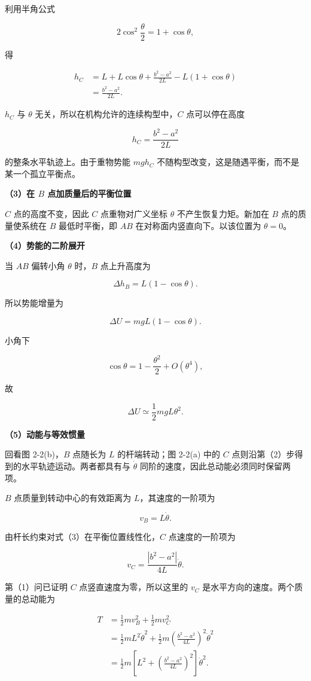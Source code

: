 \documentclass[12pt,a4paper,UTF8]{ctexart}
\begin{document}
利用半角公式

\[
2\cos^2\frac\theta2=1+\cos\theta,
\]

得

\[
\begin{aligned}
h_C
&=L+L\cos\theta
+\frac{b^2-a^2}{2L}
-L(1+\cos\theta)\\
&=\boxed{\frac{b^2-a^2}{2L}}.
\end{aligned}\tag{5}
\]

\(h_C\) 与 \(\theta\) 无关，所以在机构允许的连续构型中，\(C\)
点可以停在高度

\[
\boxed{h_C=\frac{b^2-a^2}{2L}}
\]

的整条水平轨迹上。由于重物势能 \(mgh_C\)
不随构型改变，这是随遇平衡，而不是某一个孤立平衡点。

\textbf{（3）在 \(B\) 点加质量后的平衡位置}

\(C\) 点的高度不变，因此 \(C\) 点重物对广义坐标 \(\theta\)
不产生恢复力矩。新加在 \(B\) 点的质量使系统在 \(B\) 最低时平衡，即
\(AB\) 在对称面内竖直向下。以该位置为 \(\theta=0\)。

\textbf{（4）势能的二阶展开}

当 \(AB\) 偏转小角 \(\theta\) 时，\(B\) 点上升高度为

\[
\Delta h_B=L(1-\cos\theta).
\]

所以势能增量为

\[
\Delta U=mgL(1-\cos\theta).
\]

小角下

\[
\cos\theta=1-\frac{\theta^2}{2}+O(\theta^4),
\]

故

\[
\boxed{
\Delta U\simeq\frac12mgL\theta^2
}.\tag{6}
\]

\textbf{（5）动能与等效惯量}

回看图 2-2(b)，\(B\) 点随长为 \(L\) 的杆端转动；图 2-2(a) 中的 \(C\)
点则沿第（2）步得到的水平轨迹运动。两者都具有与 \(\dot\theta\)
同阶的速度，因此总动能必须同时保留两项。

\(B\) 点质量到转动中心的有效距离为 \(L\)，其速度的一阶项为

\[
v_B=L\dot\theta.
\]

由杆长约束对式（3）在平衡位置线性化，\(C\) 点速度的一阶项为

\[
v_C=\frac{|b^2-a^2|}{4L}\dot\theta.
\]

第（1）问已证明 \(C\) 点竖直速度为零，所以这里的 \(v_C\)
是水平方向的速度。两个质量的总动能为

\[
\begin{aligned}
T
&=\frac12mv_B^2+\frac12mv_C^2\\
&=\frac12mL^2\dot\theta^2
+\frac12m\left(\frac{b^2-a^2}{4L}\right)^2\dot\theta^2\\
&=\frac12m
\left[
L^2+\left(\frac{b^2-a^2}{4L}\right)^2
\right]\dot\theta^2.
\end{aligned}\tag{7}
\]
\end{document}
